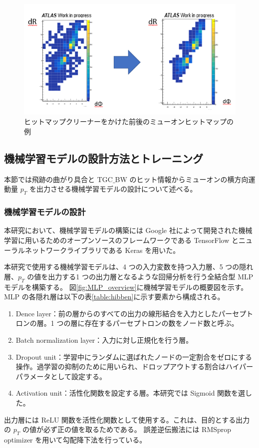 \begin{figure}[tb]
  \centering
  \includegraphics[clip, width=14cm]{fig/4/cleaner.png}
  \caption{ヒットマップクリーナーをかけた前後のミューオンヒットマップの例}
  \label{fig:hitmapcleaner}
\end{figure}


\subsection{機械学習モデルの設計方法とトレーニング}
本節では飛跡の曲がり具合と TGC$\_$BW のヒット情報からミューオンの横方向運動量 $p_T$ を出力させる機械学習モデルの設計について述べる。

\subsubsection{機械学習モデルの設計}

本研究において、機械学習モデルの構築には Google 社によって開発された機械学習に用いるためのオープンソースのフレームワークである TensorFlow \cite{article:TensorFlow}とニューラルネットワークライブラリである Keras \cite{article:keras}を用いた。

本研究で使用する機械学習モデルは、4 つの入力変数を持つ入力層、5 つの隠れ層、$p_T$ の値を出力する1 つの出力層となるような回帰分析を行う全結合型 MLP モデルを構築する。
図\ref{fig:MLP_overview}に機械学習モデルの概要図を示す。
MLP の各隠れ層は以下の表\ref{table:hibben}に示す要素から構成される。
\begin{enumerate}\label{table:hibben}
   \item Dence layer：前の層からのすべての出力の線形結合を入力としたパーセプトロンの層。1 つの層に存在するパーセプトロンの数をノード数と呼ぶ。
   \item Batch normalization layer：入力に対し正規化を行う層。
   \item Dropout unit：学習中にランダムに選ばれたノードの一定割合をゼロにする操作。過学習の抑制のために用いられ、ドロップアウトする割合はハイパーパラメータとして設定する。
   \item Activation unit：活性化関数を設定する層。本研究では Sigmoid 関数を選した。
\end{enumerate}
出力層には ReLU 関数を活性化関数として使用する。これは、目的とする出力の $p_T$ の値が必ず正の値を取るためである。
誤差逆伝搬法には RMSprop optimizer を用いて勾配降下法を行っている。

